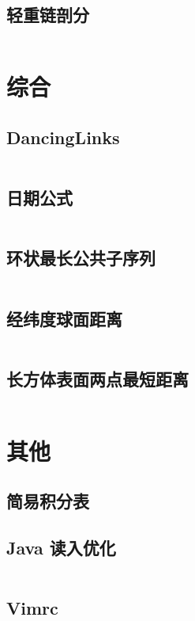 \documentclass[titlepage,landscape,a4paper,10pt]{article}
\begin{document}
\begin{multicols}{2}
\begin{spacing}{0.8}
\subsection{轻重链剖分}
\inputminted{cpp}{src/轻重链剖分.cpp}

\section{综合}

\subsection{DancingLinks}
\inputminted{cpp}{src/DancingLinks.cpp}

\subsection{日期公式}
\inputminted{cpp}{improve/日期公式.cpp}

\subsection{环状最长公共子序列}
\inputminted{cpp}{improve/CycleLongest.cpp}

\subsection{经纬度球面距离}
\inputminted{cpp}{src/经纬度求球面最短距离.cpp}

\subsection{长方体表面两点最短距离}
\inputminted{cpp}{src/长方体表面两点最短距离.cpp}

\section{其他}

\subsection{简易积分表}


\subsection{Java 读入优化}
\inputminted{java}{src/Main.java}

\subsection{Vimrc}
\inputminted{text}{src/vimrc.vim}

\end{spacing}
\end{multicols}
\end{document}

